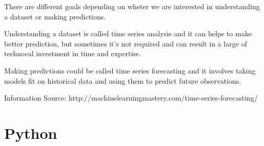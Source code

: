 There are different goals depending on wheter we are interested in understanding a dataset or making predictions.

Understanding a dataset is called time series analysis and it can helps to make better prediction, but sometimes it's not required and can result in a large of technocal investment in time and expertise.

Making predictions could be called time series forecasting and it involves taking models fit on historical data and using them to predict future observations.

Information Source: http://machinelearningmastery.com/time-series-forecasting/
\section{Python}


